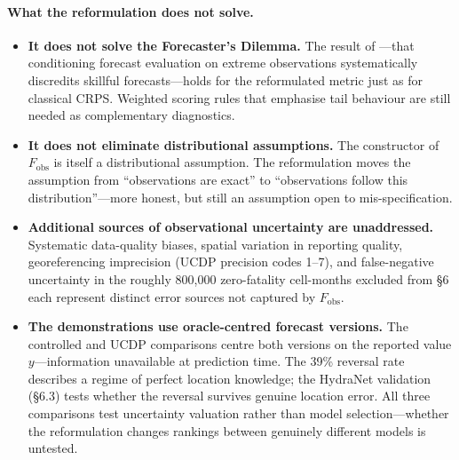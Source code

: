 \paragraph{What the reformulation does not solve.}
\begin{itemize}
    \item \textbf{It does not solve the Forecaster's Dilemma.} The result of \citet{lerch2017forecasters}---that conditioning forecast evaluation on extreme observations systematically discredits skillful forecasts---holds for the reformulated metric just as for classical CRPS. Weighted scoring rules that emphasise tail behaviour \citep{gneiting2011comparing} are still needed as complementary diagnostics.

    \item \textbf{It does not eliminate distributional assumptions.} The constructor of $F_\text{obs}$ is itself a distributional assumption. The reformulation moves the assumption from ``observations are exact'' to ``observations follow this distribution''---more honest, but still an assumption open to mis-specification.

    \item \textbf{Additional sources of observational uncertainty are unaddressed.} Systematic data-quality biases, spatial variation in reporting quality, georeferencing imprecision (UCDP precision codes 1--7), and false-negative uncertainty in the roughly 800{,}000 zero-fatality cell-months excluded from \S6 each represent distinct error sources not captured by $F_\text{obs}$.

    \item \textbf{The demonstrations use oracle-centred forecast versions.} The controlled and UCDP comparisons centre both versions on the reported value $y$---information unavailable at prediction time. The 39\% reversal rate describes a regime of perfect location knowledge; the HydraNet validation (\S6.3) tests whether the reversal survives genuine location error. All three comparisons test uncertainty valuation rather than model selection---whether the reformulation changes rankings between genuinely different models is untested.
\end{itemize}
